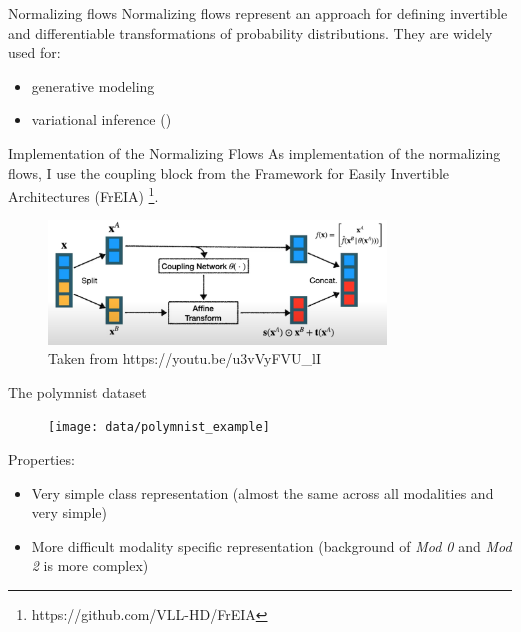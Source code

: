 \begin{frame}{Normalizing flows}
    Normalizing flows represent an approach for defining invertible and differentiable transformations of probability distributions.
    They are widely used for:
    \begin{itemize}
        \item generative modeling \citep[\textbf{GLOW}, \textbf{Real NVP}]{kingma_glow_2018, dinh_density_2017}
        \item variational inference (\cite{rezende_variational_2016, berg_sylvester_2019})
    \end{itemize}
\end{frame}

\begin{frame}{Implementation of the Normalizing Flows}
    As implementation of the normalizing flows, I use the coupling block \citep[Real NVP]{dinh_density_2017} from the Framework for Easily Invertible Architectures (FrEIA) \footnote{https://github.com/VLL-HD/FrEIA}.
    \begin{figure}
        \centering
        \includegraphics[width = 0.8\textwidth]{midterm_presentation/coupling_flow}
        \caption{\tiny{Taken from https://youtu.be/u3vVyFVU\_lI}}
    \end{figure}
\end{frame}

\begin{frame}{The polymnist dataset}
    \begin{figure}
        \centering
        \texttt{[image: data/polymnist\_example]}
    \end{figure}
    Properties:
    \begin{itemize}
        \item Very simple class representation (almost the same across all modalities and very simple)
        \item More difficult modality specific representation (background of \textit{Mod 0} and \textit{Mod 2} is more complex)
    \end{itemize}
\end{frame}


